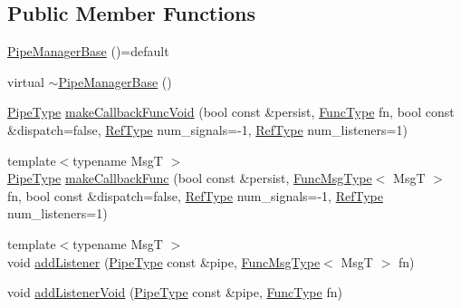 \subsection*{Public Member Functions}
\begin{DoxyCompactItemize}
\item 
\hyperlink{structvt_1_1pipe_1_1_pipe_manager_base_a6b3b1e6d6bfe21308090d2dc62743961}{Pipe\+Manager\+Base} ()=default
\item 
virtual \hyperlink{structvt_1_1pipe_1_1_pipe_manager_base_af7b66141f69a485c6fce5e02bbbd3f89}{$\sim$\+Pipe\+Manager\+Base} ()
\item 
\hyperlink{namespacevt_ac9852acda74d1896f48f406cd72c7bd3}{Pipe\+Type} \hyperlink{structvt_1_1pipe_1_1_pipe_manager_base_a20bf85e7494b5d018ed24b052f56fc28}{make\+Callback\+Func\+Void} (bool const \&persist, \hyperlink{structvt_1_1pipe_1_1_pipe_manager_base_a7ddc75a14fa50cd8521641ef6f9ea78d}{Func\+Type} fn, bool const \&dispatch=false, \hyperlink{namespacevt_a9b39ce9494bb04674d0d5b895a5aa50f}{Ref\+Type} num\+\_\+signals=-\/1, \hyperlink{namespacevt_a9b39ce9494bb04674d0d5b895a5aa50f}{Ref\+Type} num\+\_\+listeners=1)
\item 
{\footnotesize template$<$typename MsgT $>$ }\\\hyperlink{namespacevt_ac9852acda74d1896f48f406cd72c7bd3}{Pipe\+Type} \hyperlink{structvt_1_1pipe_1_1_pipe_manager_base_a7fbd6f5b88e5cca79f8588ea67ce6161}{make\+Callback\+Func} (bool const \&persist, \hyperlink{structvt_1_1pipe_1_1_pipe_manager_base_aa54eee64ab32a27777a672d49eb861f4}{Func\+Msg\+Type}$<$ MsgT $>$ fn, bool const \&dispatch=false, \hyperlink{namespacevt_a9b39ce9494bb04674d0d5b895a5aa50f}{Ref\+Type} num\+\_\+signals=-\/1, \hyperlink{namespacevt_a9b39ce9494bb04674d0d5b895a5aa50f}{Ref\+Type} num\+\_\+listeners=1)
\item 
{\footnotesize template$<$typename MsgT $>$ }\\void \hyperlink{structvt_1_1pipe_1_1_pipe_manager_base_aa878aef84540ec6c2ca89096683d407e}{add\+Listener} (\hyperlink{namespacevt_ac9852acda74d1896f48f406cd72c7bd3}{Pipe\+Type} const \&pipe, \hyperlink{structvt_1_1pipe_1_1_pipe_manager_base_aa54eee64ab32a27777a672d49eb861f4}{Func\+Msg\+Type}$<$ MsgT $>$ fn)
\item 
void \hyperlink{structvt_1_1pipe_1_1_pipe_manager_base_ae486f94f76733fd3d97ff393c35d0e5e}{add\+Listener\+Void} (\hyperlink{namespacevt_ac9852acda74d1896f48f406cd72c7bd3}{Pipe\+Type} const \&pipe, \hyperlink{structvt_1_1pipe_1_1_pipe_manager_base_a7ddc75a14fa50cd8521641ef6f9ea78d}{Func\+Type} fn)
\end{DoxyCompactItemize}
